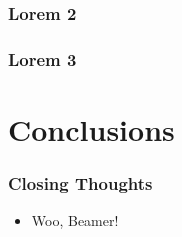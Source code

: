 \documentclass[aspectratio=169]{beamer}
\begin{document}
		\begin{frame}
			\frametitle{Lorem 2}
			\blindtext
		\end{frame}

		\begin{frame}
			\frametitle{Lorem 3}
			\blindtext
		\end{frame}

	\section{Conclusions}
		\begin{frame}
			\frametitle{Closing Thoughts}
			\begin{itemize}
				\item Woo, Beamer!
			\end{itemize}
		\end{frame}

		
		
\end{document}
